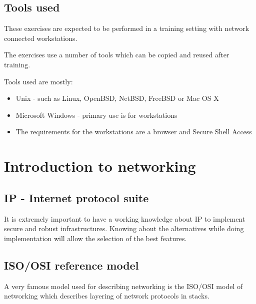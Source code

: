 \documentclass[a4paper,11pt,notitlepage]{report}
\begin{document}
\section*{\color{titlecolor}Tools used}

These exercises are expected to be performed in a training setting with network connected workstations.

The exercises use a number of tools which can be copied and reused after training.

Tools used are mostly:

\begin{itemize}
\item Unix - such as Linux, OpenBSD, NetBSD, FreeBSD or Mac OS X
\item Microsoft Windows - primary use is for workstations
\item The requirements for the workstations are a browser and Secure Shell Access
\end{itemize}


\rhead{\fancyplain{}{\bf \chaptername\ \thechapter}}


\chapter*{\color{titlecolor}Introduction to networking}
\label{chap:intro}

\section*{\color{titlecolor}IP - Internet protocol suite}

It is extremely important to have a working knowledge about IP to implement
secure and robust infrastructures. Knowing about the alternatives while doing
implementation will allow the selection of the best features.

\section*{\color{titlecolor}ISO/OSI reference model}
A very famous model used for describing networking is the ISO/OSI model
of networking which describes layering of network protocols in stacks.
\end{document}
